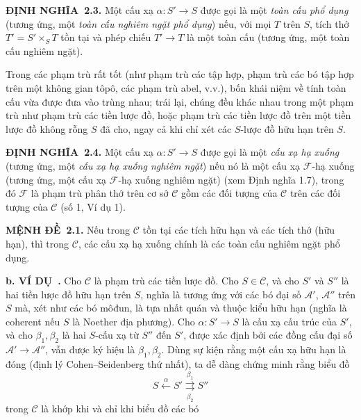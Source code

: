 \documentclass[11pt,twoside,openany]{book}
\numberwithin{equation}{section}
\newcommand{\result}[2]{\par\medskip\noindent\textbf{#1\if\relax\detokenize{#2}\relax\else\ #2\fi.}\quad}
\begin{document}
\result{ĐỊNH NGHĨA}{2.3} Một cấu xạ $\alpha:S'\longrightarrow S$ được gọi là
một \emph{toàn cấu phổ dụng} (tương ứng, một \emph{toàn cấu nghiêm ngặt phổ
dụng}) nếu, với mọi $T$ trên $S$, tích thớ $T'=S'\times_ST$ tồn tại và phép
chiếu $T'\longrightarrow T$ là một toàn cấu (tương ứng, một toàn cấu nghiêm
ngặt).

Trong các phạm trù rất tốt (như phạm trù các tập hợp, phạm trù các bó tập hợp
trên một không gian tôpô, các phạm trù abel, v.v.), bốn khái niệm về tính toàn
cấu vừa được đưa vào trùng nhau; trái lại, chúng đều khác nhau trong một phạm
trù như phạm trù các tiền lược đồ, hoặc phạm trù các tiền lược đồ trên một tiền
lược đồ không rỗng $S$ đã cho, ngay cả khi chỉ xét các $S$-lược đồ hữu hạn trên
$S$.

\result{ĐỊNH NGHĨA}{2.4} Một cấu xạ $\alpha:S'\longrightarrow S$ được gọi là
một \emph{cấu xạ hạ xuống} (tương ứng, một \emph{cấu xạ hạ xuống nghiêm
ngặt}) nếu nó là một cấu xạ $\mathcal F$-hạ xuống (tương ứng, một cấu xạ
$\mathcal F$-hạ xuống nghiêm ngặt) (xem Định nghĩa 1.7), trong đó $\mathcal F$
là phạm trù phân thớ trên cơ sở $\mathcal C$ gồm các đối tượng của
$\mathcal C$ trên các đối tượng của $\mathcal C$ (số 1, Ví dụ 1).

\result{MỆNH ĐỀ}{2.1} Nếu trong $\mathcal C$ tồn tại các tích hữu hạn và các
tích thớ (hữu hạn), thì trong $\mathcal C$, các cấu xạ hạ xuống chính là các
toàn cấu nghiêm ngặt phổ dụng.

\result{b. VÍ DỤ}{} Cho $\mathcal C$ là phạm trù các tiền lược đồ. Cho
$S\in\mathcal C$, và cho $S'$ và $S''$ là hai tiền lược đồ hữu hạn trên $S$,
nghĩa là tương ứng với các bó đại số $\mathcal A'$, $\mathcal A''$ trên $S$
mà, xét như các bó môđun, là tựa nhất quán và thuộc kiểu hữu hạn (nghĩa là
coherent nếu $S$ là Noether địa phương). Cho $\alpha:S'\longrightarrow S$ là
cấu xạ cấu trúc của $S'$, và cho $\beta_1,\beta_2$ là hai $S$-cấu xạ từ $S''$
đến $S'$, được xác định bởi các đồng cấu đại số
$\mathcal A'\longrightarrow\mathcal A''$, vẫn được ký hiệu là
$\beta_1,\beta_2$. Dùng sự kiện rằng một cấu xạ hữu hạn là đóng (định lý
Cohen--Seidenberg thứ nhất), ta dễ dàng chứng minh rằng biểu đồ
\[
  \tag{+}
  S\xleftarrow{\alpha}S'
  \overset{\beta_1}{\underset{\beta_2}{\rightrightarrows}}S''
\]
trong $\mathcal C$ là khớp khi và chỉ khi biểu đồ các bó
\end{document}
